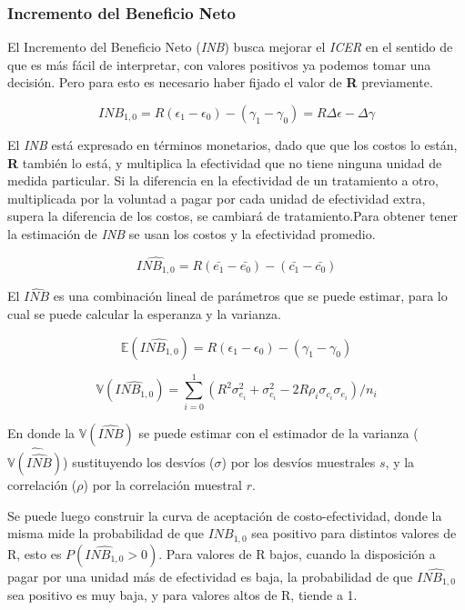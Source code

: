 \documentclass{siep}
\begin{document}
\subsubsection{Incremento del Beneficio Neto}
\label{sec:IBN}
El Incremento del Beneficio Neto (\textit{INB}) busca mejorar el \textit{ICER} en el sentido de que es más fácil de interpretar, con valores positivos ya podemos tomar una decisión. Pero para esto es necesario haber fijado el valor de \textbf{R} previamente.

\begin{equation}
INB_{1,0} = R(\epsilon_1-\epsilon_0)-(\gamma_1-\gamma_0) = R\Delta\epsilon-\Delta\gamma
\end{equation}

El \textit{INB}  está expresado en términos monetarios, dado que que los costos lo están, \textbf{R} también lo está, y multiplica la efectividad que no tiene ninguna unidad de medida particular. Si la diferencia en la efectividad de un tratamiento a otro, multiplicada por la voluntad a pagar por cada unidad de efectividad extra, supera la diferencia de los costos, se cambiará de tratamiento.Para obtener tener la estimación de \textit{INB} se usan los costos y la efectividad promedio.

\begin{equation}
\widehat{INB_{1,0}} = R(\bar{e_{1}}-\bar{e_{0}})-(\bar{c_{1}}-\bar{c_{0}})
\end{equation}

El $\widehat{INB}$ es una combinación lineal de parámetros que se puede estimar,  para lo cual se puede calcular la esperanza y la varianza. 

\begin{equation}
\mathbb{E}(\widehat{INB_{1,0}})=R(\epsilon_1-\epsilon_0)-(\gamma_1-\gamma_0)
\end{equation}

\begin{equation}
\mathbb{V}(\widehat{INB_{1,0}})=\sum_{i=0}^1(R^2\sigma^2_{e_i}+\sigma^2_{c_i}-2R\rho_i\sigma_{c_i}\sigma_{e_i})/n_i
\end{equation}

En donde la $\mathbb{V}(\widehat{INB})$ se puede estimar con el estimador de la varianza ($\widehat{\mathbb{V}(\widehat{INB})}$) sustituyendo los desvíos ($\sigma$) por los desvíos muestrales $s$, y la correlación ($\rho$) por la correlación muestral $r$.

Se puede luego construir la curva de aceptación de costo-efectividad, donde  la misma mide la probabilidad de que $INB_{1,0}$ sea positivo para distintos valores de R, esto es $P(\widehat{INB_{1,0}}>0)$. Para valores de R bajos, cuando la disposición a pagar por una unidad más de efectividad es baja, la probabilidad de que $\widehat{INB_{1,0}}$ sea positivo es muy baja, y para valores altos de R, tiende a 1.
\end{document}
